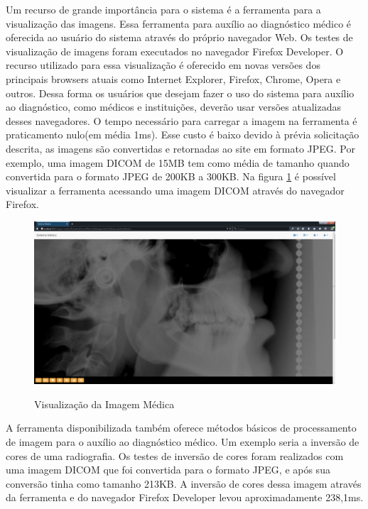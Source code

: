 Um recurso de grande importância para o sistema é a ferramenta para a visualização das imagens. Essa ferramenta para auxílio ao diagnóstico médico é oferecida ao usuário do 
sistema através do próprio navegador Web. Os testes de visualização de imagens foram executados no navegador Firefox Developer. O recurso utilizado para essa visualização é 
oferecido em novas versões dos principais browsers atuais como Internet Explorer, Firefox, Chrome, Opera e outros. Dessa forma os usuários que desejam fazer o uso do sistema 
para auxílio ao diagnóstico, como médicos e instituições, deverão usar versões atualizadas desses navegadores. O tempo necessário para carregar a imagem na ferramenta é
praticamento nulo(em média 1ms). Esse custo é baixo devido à prévia solicitação descrita, as imagens são convertidas e retornadas ao site em formato JPEG. Por exemplo, uma  imagem DICOM de 15MB tem como média de tamanho quando convertida para o formato JPEG de 200KB a 300KB. Na figura \ref{fig:figura4} é possível visualizar a ferramenta acessando uma imagem DICOM através do navegador Firefox.

\begin{figure}[ht]
	\centering	
	\caption[\hspace{0.1cm}Imagens Clínicas.]{Visualização da Imagem Médica}
	\vspace{-0.4cm}
	\includegraphics[width=1.0\textwidth]{figuras/visualizacaoImagemMedicaGrandeResolucao.png}
	\vspace{-0.2cm}
	\label{fig:figura4}
\end{figure}

A ferramenta disponibilizada também oferece métodos básicos de processamento de imagem para o auxílio ao diagnóstico médico. Um exemplo seria a inversão de cores de uma radiografia. Os testes de inversão de cores foram realizados com uma imagem DICOM que foi convertida para o formato JPEG, e após sua conversão tinha como  tamanho 213KB. A inversão de cores dessa imagem através da ferramenta e do navegador Firefox Developer levou aproximadamente 238,1ms. 

